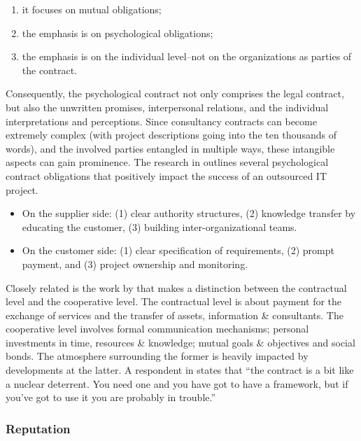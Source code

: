 \documentclass[12pt]{article}
\providecommand{\tightlist}{%
  \setlength{\itemsep}{0pt}\setlength{\parskip}{0pt}}
\begin{document}
\begin{enumerate}
\def\labelenumi{\arabic{enumi}.}
\tightlist
\item
  it focuses on mutual obligations;
\item
  the emphasis is on psychological obligations;
\item
  the emphasis is on the individual level--not on the organizations as
  parties of the contract.
\end{enumerate}

Consequently, the psychological contract not only comprises the legal
contract, but also the unwritten promises, interpersonal relations, and
the individual interpretations and perceptions. Since consultancy
contracts can become extremely complex (with project descriptions going
into the ten thousands of words), and the involved parties entangled in
multiple ways, these intangible aspects can gain prominence. The
research in \citet[369-70]{ang2004} outlines several psychological
contract obligations that positively impact the success of an outsourced
IT project.

\begin{itemize}
\tightlist
\item
  On the supplier side: (1) clear authority structures, (2) knowledge
  transfer by educating the customer, (3) building inter-organizational
  teams.
\item
  On the customer side: (1) clear specification of requirements, (2)
  prompt payment, and (3) project ownership and monitoring.
\end{itemize}

Closely related is the work by \citet[9-13]{willcockskern} that makes a
distinction between the contractual level and the cooperative level. The
contractual level is about payment for the exchange of services and the
transfer of assets, information \& consultants. The cooperative level
involves formal communication mechanisms; personal investments in time,
resources \& knowledge; mutual goals \& objectives and social bonds. The
atmosphere surrounding the former is heavily impacted by developments at
the latter. A respondent in \citet[9]{willcockskern} states that ``the
contract is a bit like a nuclear deterrent. You need one and you have
got to have a framework, but if you've got to use it you are probably in
trouble.''

\hypertarget{reputation}{%
\subsubsection{Reputation}\label{reputation}}
\end{document}
